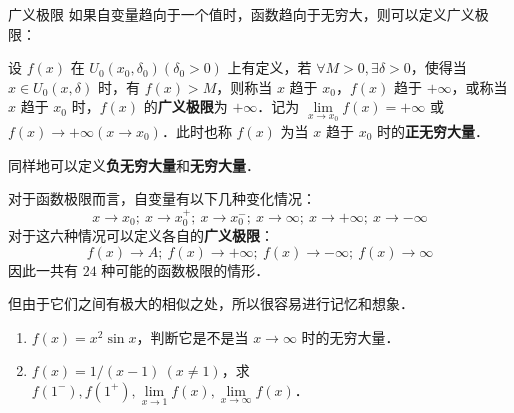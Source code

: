 \begin{definition}{广义极限}
如果自变量趋向于一个值时，函数趋向于无穷大，则可以定义广义极限：

  设 $f(x)$ 在 $U_0(x_0,\delta_0)(\delta_0>0)$ 上有定义，若 $\forall M>0,\exists \delta>0$，使得当 $x\in U_0(x,\delta)$ 时，有 $f(x)>M$，则称当 $x$ 趋于 $x_0$，$f(x)$ 趋于 $+\infty$，或称当 $x$ 趋于 $x_0$ 时，$f(x)$ 的\textbf{广义极限}为 $+\infty$．记为 $\lim\limits_{x\rightarrow x_0}f(x)=+\infty$ 或 $f(x)\rightarrow +\infty(x\rightarrow x_0)$．此时也称 $f(x)$ 为当 $x$ 趋于 $x_0$ 时的\textbf{正无穷大量}．

  同样地可以定义\textbf{负无穷大量}和\textbf{无穷大量}．
\end{definition}

  

  对于函数极限而言，自变量有以下几种变化情况：
\begin{equation}
  x\rightarrow x_0;\ x\rightarrow x_0^+;\ x\rightarrow x_0^{-};\ x\rightarrow \infty;\ x\rightarrow +\infty;\ x\rightarrow -\infty
\end{equation}
  对于这六种情况可以定义各自的\textbf{广义极限}：
\begin{equation}
  f(x)\rightarrow A;\ f(x)\rightarrow +\infty;\ f(x)\rightarrow -\infty;\ f(x)\rightarrow \infty
\end{equation}
  因此一共有 $24$ 种可能的函数极限的情形．

  但由于它们之间有极大的相似之处，所以很容易进行记忆和想象．

\begin{exercise}{}
\begin{enumerate}
\item $f(x)=x^2\sin x$，判断它是不是当 $x\rightarrow \infty$ 时的无穷大量．
\item $f(x)=1/(x-1)\ (x\neq 1)$，求 $f(1^-),f(1^+),\lim\limits_{x\rightarrow 1}f(x),\lim\limits_{x\rightarrow \infty}f(x)$．
\end{enumerate}
\end{exercise}